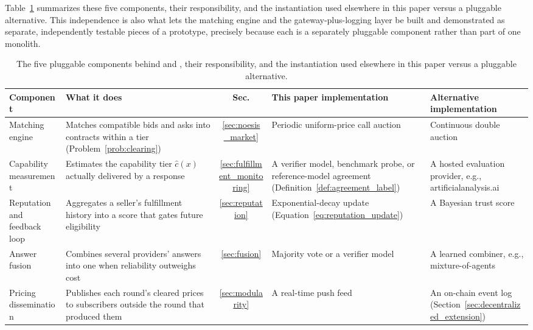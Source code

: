 Table~\ref{tab:components} summarizes these five components, their
responsibility, and the instantiation used elsewhere in this paper versus a
pluggable alternative. This independence is also what lets the matching
engine and the gateway-plus-logging layer be built and demonstrated as
separate, independently testable pieces of a prototype, precisely because
each is a separately pluggable component rather than part of one monolith.

\begin{samepage}
  \begin{table}[H]
    \centering
    \scriptsize
    \begin{tabular}{p{2.0cm}|p{3.3cm}|c|p{2.9cm}|p{2.9cm}|}
      \textbf{Component} & \textbf{What it does} & \textbf{Sec.} & \textbf{This paper implementation} & \textbf{Alternative implementation} \\
      \hline
      Matching engine & Matches compatible bids and asks into contracts within a tier (Problem~\ref{prob:clearing}) & \ref{sec:noesis_market} & Periodic uniform-price call auction & Continuous double auction \\
      \hline
      Capability measurement & Estimates the capability tier $\hat c(x)$ actually delivered by a response & \ref{sec:fulfillment_monitoring} & A verifier model, benchmark probe, or reference-model agreement (Definition~\ref{def:agreement_label}) & A hosted evaluation provider, e.g., artificialanalysis.ai \\
      \hline
      Reputation and feedback loop & Aggregates a seller's fulfillment history into a score that gates future eligibility & \ref{sec:reputation} & Exponential-decay update (Equation~\eqref{eq:reputation_update}) & A Bayesian trust score \\
      \hline
      Answer fusion & Combines several providers' answers into one when reliability outweighs cost & \ref{sec:fusion} & Majority vote or a verifier model & A learned combiner, e.g., mixture-of-agents \cite{wang2024moa} \\
      \hline
      Pricing dissemination & Publishes each round's cleared prices to subscribers outside the round that produced them & \ref{sec:modularity} & A real-time push feed & An on-chain event log (Section~\ref{sec:decentralized_extension}) \\
      \hline
    \end{tabular}
    \caption{The five pluggable components behind \NoesisMarket{} and
      \NoesisServer, their responsibility, and the instantiation used
      elsewhere in this paper versus a pluggable alternative.}
    \label{tab:components}
  \end{table}
\end{samepage}

